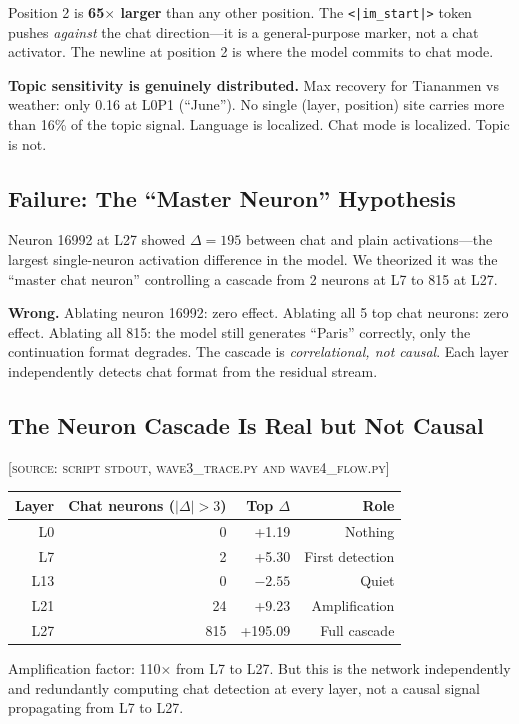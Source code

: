 \documentclass[11pt,a4paper]{article}
\begin{document}
Position 2 is \textbf{65$\times$ larger} than any other position. The \texttt{<|im\_start|>} token pushes \textit{against} the chat direction---it is a general-purpose marker, not a chat activator. The newline at position 2 is where the model commits to chat mode.

\textbf{Topic sensitivity is genuinely distributed.} Max recovery for Tiananmen vs weather: only 0.16 at L0P1 (``June''). No single (layer, position) site carries more than 16\% of the topic signal. Language is localized. Chat mode is localized. Topic is not.

\subsection{Failure: The ``Master Neuron'' Hypothesis}
Neuron 16992 at L27 showed $\Delta=195$ between chat and plain activations---the largest single-neuron activation difference in the model. We theorized it was the ``master chat neuron'' controlling a cascade from 2 neurons at L7 to 815 at L27.

\textbf{Wrong.} Ablating neuron 16992: zero effect. Ablating all 5 top chat neurons: zero effect. Ablating all 815: the model still generates ``Paris'' correctly, only the continuation format degrades. The cascade is \textit{correlational, not causal}. Each layer independently detects chat format from the residual stream.

\subsection{The Neuron Cascade Is Real but Not Causal}
\textsc{[source: script stdout, wave3\_trace.py and wave4\_flow.py]}

\begin{center}
\begin{tabular}{rrrr}
\toprule
\textbf{Layer} & \textbf{Chat neurons ($|\Delta|>3$)} & \textbf{Top $\Delta$} & \textbf{Role} \\
\midrule
L0 & 0 & +1.19 & Nothing \\
L7 & 2 & +5.30 & First detection \\
L13 & 0 & $-2.55$ & Quiet \\
L21 & 24 & +9.23 & Amplification \\
L27 & 815 & +195.09 & Full cascade \\
\bottomrule
\end{tabular}
\end{center}

Amplification factor: 110$\times$ from L7 to L27. But this is the network independently and redundantly computing chat detection at every layer, not a causal signal propagating from L7 to L27.
\end{document}
